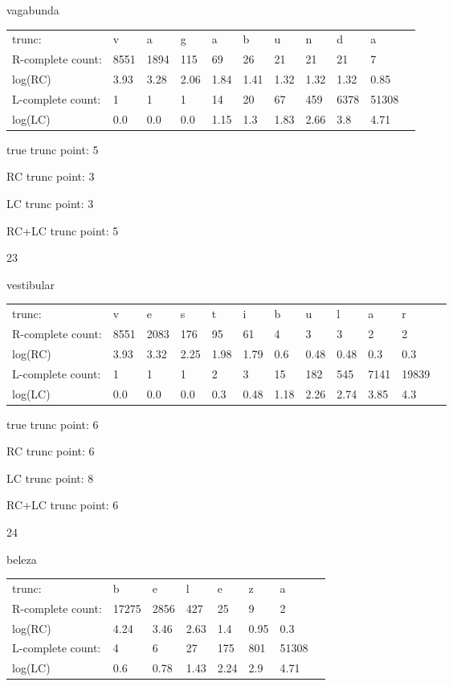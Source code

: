 \documentclass{article}
\begin{document}
vagabunda

\begin{tabular}{l|llllllllll}
trunc: & v & a & g & a & b & u & n & d & a & \\ 
R-complete count: & 8551 & 1894 & 115 & 69 & 26 & 21 & 21 & 21 & 7 & \\ 
log(RC) & 3.93 & 3.28 & 2.06 & 1.84 & 1.41 & 1.32 & 1.32 & 1.32 & 0.85 & \\ 
L-complete count: & 1 & 1 & 1 & 14 & 20 & 67 & 459 & 6378 & 51308 & \\ 
log(LC) & 0.0 & 0.0 & 0.0 & 1.15 & 1.3 & 1.83 & 2.66 & 3.8 & 4.71 & \\ 
\end{tabular}

true trunc point: 5

RC trunc point: 3

LC trunc point: 3

RC+LC trunc point: 5

\vspace{1em}

23

vestibular

\begin{tabular}{l|lllllllllll}
trunc: & v & e & s & t & i & b & u & l & a & r & \\ 
R-complete count: & 8551 & 2083 & 176 & 95 & 61 & 4 & 3 & 3 & 2 & 2 & \\ 
log(RC) & 3.93 & 3.32 & 2.25 & 1.98 & 1.79 & 0.6 & 0.48 & 0.48 & 0.3 & 0.3 & \\ 
L-complete count: & 1 & 1 & 1 & 2 & 3 & 15 & 182 & 545 & 7141 & 19839 & \\ 
log(LC) & 0.0 & 0.0 & 0.0 & 0.3 & 0.48 & 1.18 & 2.26 & 2.74 & 3.85 & 4.3 & \\ 
\end{tabular}

true trunc point: 6

RC trunc point: 6

LC trunc point: 8

RC+LC trunc point: 6

\vspace{1em}

24

beleza

\begin{tabular}{l|lllllll}
trunc: & b & e & l & e & z & a & \\ 
R-complete count: & 17275 & 2856 & 427 & 25 & 9 & 2 & \\ 
log(RC) & 4.24 & 3.46 & 2.63 & 1.4 & 0.95 & 0.3 & \\ 
L-complete count: & 4 & 6 & 27 & 175 & 801 & 51308 & \\ 
log(LC) & 0.6 & 0.78 & 1.43 & 2.24 & 2.9 & 4.71 & \\ 
\end{tabular}
\end{document}
